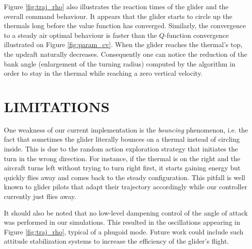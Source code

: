 \documentclass[a4paper, 10pt, conference]{ieeeconf}
\begin{document}
Figure \ref{fig:traj_rho} also illustrates the reaction times of the glider and the overall command behaviour. It appears that the glider starts to circle up the thermals long before the value function has converged. Similarly, the convergence to a steady air optimal behaviour is faster than the $Q$-function convergence illustrated on Figure \ref{fig:param_cv}.
{\color{red} When the glider reaches the thermal's top, the updraft naturally decreases. Consequently one can notice the reduction of the bank angle (enlargement of the turning radius) computed by the algorithm in order to stay in the thermal while reaching a zero vertical velocity.}


\section{LIMITATIONS}
\label{sec:limit}


One weakness of our current implementation is the \textit{bouncing} phenomenon, i.e. the fact that sometimes the glider literally bounces on a thermal instead of circling inside. This is due to the random action exploration strategy that initiates the turn in the wrong direction. For instance, if the thermal is on the right and the aircraft turns left without trying to turn right first, it starts gaining energy but quickly flies away and comes back to the steady configuration. This pitfall is well known to glider pilots that adapt their trajectory accordingly while our controller currently just flies away.

It should also be noted that no low-level dampening control of the angle of attack was performed in our simulations. This resulted in the oscillations appearing in Figure \ref{fig:traj_rho}, typical of a phugoid mode. Future work could include such attitude stabilization systems to increase the efficiency of the glider's flight.
\end{document}
